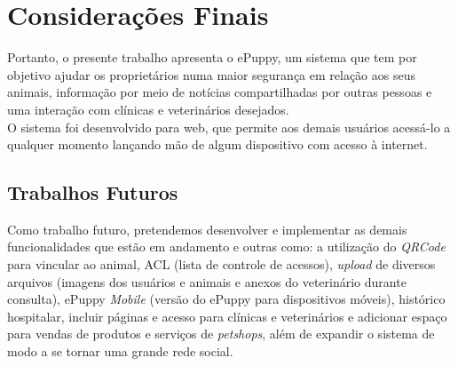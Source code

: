 \chapter{Considerações Finais}

Portanto, o presente trabalho apresenta o ePuppy, um sistema que tem por objetivo ajudar os proprietários numa maior segurança em relação aos seus animais, informação por meio de notícias compartilhadas por outras pessoas e uma interação com clínicas e veterinários desejados.
\\
\indent
O sistema foi desenvolvido para web, que permite aos demais usuários acessá-lo a qualquer momento lançando mão de algum dispositivo com acesso à internet.

\section{Trabalhos Futuros}

Como trabalho futuro, pretendemos desenvolver e implementar as demais funcionalidades que estão em andamento e outras como: a utilização do {\it QRCode} para vincular ao animal, ACL (lista de controle de acessos), {\it upload} de diversos arquivos (imagens dos usuários e animais e anexos do veterinário durante consulta), ePuppy {\it Mobile} (versão do ePuppy para dispositivos móveis), histórico hospitalar, incluir páginas e acesso para clínicas e veterinários e adicionar espaço para vendas de produtos e serviços de {\it petshops}, além de expandir o sistema de modo a se tornar uma grande rede social.

